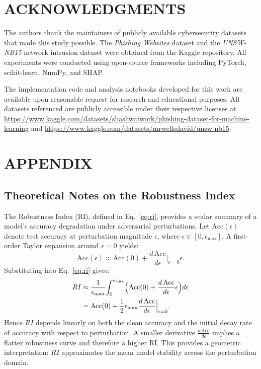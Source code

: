 \documentclass[a4paper,twoside]{article}
\begin{document}
\section*{\uppercase{Acknowledgments}}

The authors thank the maintainers of publicly available cybersecurity datasets 
that made this study possible. 
The \textit{Phishing Websites} dataset and the \textit{UNSW-NB15} network intrusion dataset 
were obtained from the Kaggle repository. 
All experiments were conducted using open-source frameworks including 
PyTorch, scikit-learn, NumPy, and SHAP.

The implementation code and analysis notebooks developed for this work 
are available upon reasonable request for research and educational purposes. 
All datasets referenced are publicly accessible under their respective licenses at 
\url{https://www.kaggle.com/datasets/shashwatwork/phishing-dataset-for-machine-learning} 
and 
\url{https://www.kaggle.com/datasets/mrwellsdavid/unsw-nb15}.


{\small
}


\section*{\uppercase{Appendix}}
\subsection*{Theoretical Notes on the Robustness Index}

The Robustness Index (RI), defined in Eq.~\ref{eq:ri}, provides a scalar summary of a model's
accuracy degradation under adversarial perturbations.
Let $\text{Acc}(\epsilon)$ denote test accuracy at perturbation magnitude $\epsilon$,
where $\epsilon \in [0, \epsilon_{\max}]$.
A first-order Taylor expansion around $\epsilon=0$ yields:
\begin{equation}
\text{Acc}(\epsilon) \approx \text{Acc}(0) + 
\frac{d\,\text{Acc}}{d\epsilon}\Big|_{\epsilon=0} \epsilon .
\end{equation}
Substituting into Eq.~\ref{eq:ri} gives:
\begin{align}
RI &\approx 
\frac{1}{\epsilon_{\max}}\!\int_0^{\epsilon_{\max}}\!
\Big(\text{Acc}(0) + \frac{d\,\text{Acc}}{d\epsilon}\epsilon\Big)d\epsilon \notag\\
&= \text{Acc}(0) + 
\frac{1}{2}\epsilon_{\max}\frac{d\,\text{Acc}}{d\epsilon}\Big|_{\epsilon=0}.
\end{align}
Hence $RI$ depends linearly on both the clean accuracy and the
initial decay rate of accuracy with respect to perturbation.
A smaller derivative $\tfrac{d\,\text{Acc}}{d\epsilon}$ implies a flatter
robustness curve and therefore a higher RI.
This provides a geometric interpretation: $RI$ approximates the mean model
stability across the perturbation domain.
\end{document}
